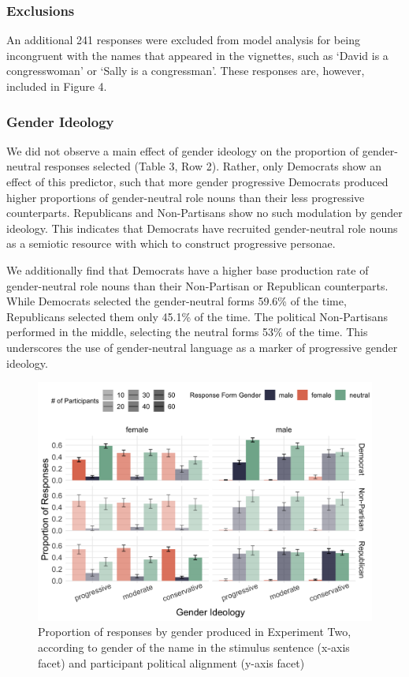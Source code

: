 \documentclass[10pt,letterpaper]{article}
\begin{document}
	\subsubsection{Exclusions} 
	An additional 241 responses were excluded from model analysis for being incongruent with the names that appeared in the vignettes, such as `David is a congresswoman' or `Sally is a congressman'. These responses are, however, included in Figure 4. 
	
	\subsubsection{Gender Ideology} We did not observe a main effect of gender ideology on the proportion of gender-neutral responses selected (Table 3, Row 2). Rather, only Democrats show an effect of this predictor, such that more gender progressive Democrats produced higher proportions of gender-neutral role nouns than their less progressive counterparts. Republicans and Non-Partisans show no such modulation by gender ideology. This indicates that Democrats have recruited gender-neutral role nouns as a semiotic resource with which to construct progressive personae. \par
	We additionally find that Democrats have a higher base production rate of gender-neutral role nouns than their Non-Partisan or Republican counterparts. While Democrats selected the gender-neutral forms 59.6\% of the time, Republicans selected them only 45.1\% of the time. The political Non-Partisans performed in the middle, selecting the neutral forms 53\% of the time. This underscores the use of gender-neutral language as a marker of progressive gender ideology.
	
	\begin{figure}[h]
		\centering
		\includegraphics[scale=0.12]{prod-3x2x3.png}
		\caption{Proportion of responses by gender produced in Experiment Two, according to gender of the name in the stimulus sentence (x-axis facet) and participant political alignment (y-axis facet)}
	\end{figure}
\end{document}
